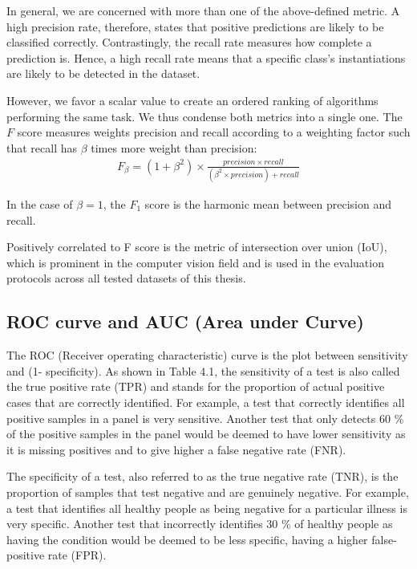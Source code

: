 In general, we are concerned with more than one of the above-defined metric.
A high precision rate, therefore, states that positive predictions are likely to be classified correctly. Contrastingly, the recall rate measures how complete a prediction is. Hence, a high recall rate means that a specific class's instantiations are likely to be detected in the dataset.

However, we favor a scalar value to create an ordered ranking of algorithms performing the same task. We thus condense both metrics into a single one. The $F$ score measures weights precision and recall according to a weighting factor such that recall has $ \beta $ times more weight than precision:
\begin{equation}
\begin{split}
F_{\beta }=\left ( 1+\beta ^{2} \right )\times \frac{precision\times recall}{\left (\beta ^{2}\times precision \right )+recall }
\label{}
\end{split}
\end{equation}

In the case of $ \beta = 1$, the $F_{1 }$ score is the harmonic mean between precision and recall.

Positively correlated to F score is the metric of intersection over union (IoU), which is prominent in the computer vision field and is used in the evaluation protocols across all tested datasets of this thesis.




\subsection{ROC curve and AUC (Area under Curve)}
The ROC (Receiver operating characteristic) curve is the plot between sensitivity and (1- specificity). As shown in Table 4.1, the sensitivity of a test is also called the true positive rate (TPR) and stands for the proportion of actual positive cases that are correctly identified. For example, a test that correctly identifies all positive samples in a panel is very sensitive. Another test that only detects 60 \% of the positive samples in the panel would be deemed to have lower sensitivity as it is missing positives and to give higher a false negative rate (FNR).

The specificity of a test, also referred to as the true negative rate (TNR), is the proportion of samples that test negative and are genuinely negative. For example, a test that identifies all healthy people as being negative for a particular illness is very specific. Another test that incorrectly identifies 30 \% of healthy people as having the condition would be deemed to be less specific, having a higher false-positive rate (FPR).

